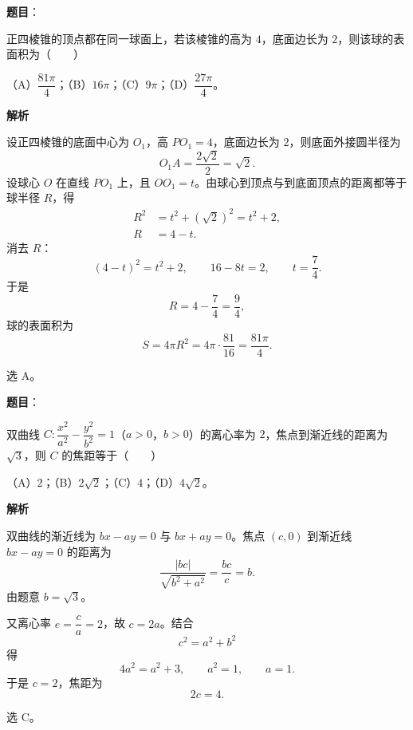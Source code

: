 \begin{answer}

\textbf{题目}：

正四棱锥的顶点都在同一球面上，若该棱锥的高为 $4$，底面边长为 $2$，则该球的表面积为\mbox{（　　）}

（A）$\dfrac{81\pi}{4}$；（B）$16\pi$；（C）$9\pi$；（D）$\dfrac{27\pi}{4}$。

\textbf{解析}

设正四棱锥的底面中心为 $O_1$，高 $PO_1=4$，底面边长为 $2$，则底面外接圆半径为
\nopagebreak[4]
\[O_1A=\frac{2\sqrt2}{2}=\sqrt2.\]
设球心 $O$ 在直线 $PO_1$ 上，且 $OO_1=t$。由球心到顶点与到底面顶点的距离都等于球半径 $R$，得
\nopagebreak[4]
\[\begin{aligned}
R^2&=t^2+(\sqrt2)^2=t^2+2,\\
R&=4-t.
\end{aligned}\]
消去 $R$：
\nopagebreak[4]
\[(4-t)^2=t^2+2,\qquad 16-8t=2,\qquad t=\frac74.\]
于是
\nopagebreak[4]
\[R=4-\frac74=\frac94,\]
球的表面积为
\nopagebreak[4]
\[S=4\pi R^2=4\pi\cdot\frac{81}{16}=\frac{81\pi}{4}.\]

选 A。


\end{answer}
\begin{answer}

\textbf{题目}：

双曲线 $C:\dfrac{x^2}{a^2}-\dfrac{y^2}{b^2}=1$（$a>0$，$b>0$）的离心率为 $2$，焦点到渐近线的距离为 $\sqrt3$，则 $C$ 的焦距等于\mbox{（　　）}

（A）$2$；（B）$2\sqrt2$；（C）$4$；（D）$4\sqrt2$。

\textbf{解析}

双曲线的渐近线为 $bx-ay=0$ 与 $bx+ay=0$。焦点 $(c,0)$ 到渐近线 $bx-ay=0$ 的距离为
\nopagebreak[4]
\[\frac{|bc|}{\sqrt{b^2+a^2}}=\frac{bc}{c}=b.\]
由题意 $b=\sqrt3$。

又离心率 $e=\dfrac ca=2$，故 $c=2a$。结合
\nopagebreak[4]
\[c^2=a^2+b^2\]
得
\nopagebreak[4]
\[4a^2=a^2+3,\qquad a^2=1,\qquad a=1.\]
于是 $c=2$，焦距为
\nopagebreak[4]
\[2c=4.\]

选 C。


\end{answer}
